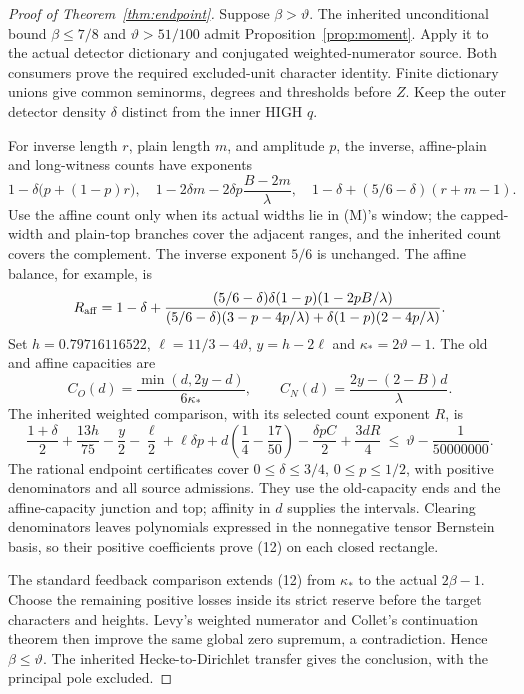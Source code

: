 \documentclass[10pt,a4paper]{article}
\newcommand{\tht}{\vartheta}\newcommand{\kap}{\kappa}
\begin{document}
\begin{proof}[Proof of Theorem~\ref{thm:endpoint}]
Suppose $\beta>\tht$. The inherited unconditional bound $\beta\le7/8$
and $\tht>51/100$ admit Proposition~\ref{prop:moment}. Apply it to the
actual detector dictionary and conjugated weighted-numerator source. Both
consumers prove the required excluded-unit character identity. Finite
dictionary unions give common seminorms, degrees and thresholds before $Z$.
Keep the outer detector density $\delta$ distinct from the inner HIGH $q$.

For inverse length $r$, plain length $m$, and amplitude $p$, the inverse,
affine-plain and long-witness counts have exponents
\[
 1-\delta\bigl(p+(1-p)r\bigr),\quad
 1-2\delta m-2\delta p\frac{B-2m}{\lambda},\quad
 1-\delta+(5/6-\delta)(r+m-1).                          \tag{11}
\]
Use the affine count only when its actual widths lie in (M)'s window; the
capped-width and plain-top branches cover the adjacent ranges, and the
inherited count covers the complement. The inverse exponent $5/6$ is
unchanged. The affine balance, for example, is
\[
 R_{\rm aff}=1-\delta+
 \frac{(5/6-\delta)\delta(1-p)(1-2pB/\lambda)}
 {(5/6-\delta)(3-p-4p/\lambda)+\delta(1-p)(2-4p/\lambda)}.
\]
Set $h=0.79716116522$, $\ell=11/3-4\tht$, $y=h-2\ell$ and
$\kap_*=2\tht-1$. The old and affine capacities are
\[
 C_O(d)=\frac{\min(d,2y-d)}{6\kap_*},\qquad
 C_N(d)=\frac{2y-(2-B)d}{\lambda}.
\]
The inherited weighted comparison, with its selected count exponent $R$, is
\[
 \frac{1+\delta}{2}+\frac{13h}{75}-\frac y2-\frac\ell2+\ell\delta p
 +d\left(\frac14-\frac{17}{50}\right)-\frac{\delta pC}{2}
 +\frac{3dR}{4}\ \le\ \tht-\frac1{50000000}.           \tag{12}
\]
The rational endpoint certificates cover $0\le\delta\le3/4$,
$0\le p\le1/2$, with positive denominators and all source admissions.
They use the old-capacity ends and the affine-capacity junction and top;
affinity in $d$ supplies the intervals. Clearing denominators leaves
polynomials expressed in the nonnegative tensor Bernstein basis, so their
positive coefficients prove (12) on each closed rectangle.

The standard feedback comparison extends (12) from
$\kap_*$ to the actual $2\beta-1$. Choose the remaining positive losses
inside its strict reserve before the target characters and heights.
Levy's weighted numerator and Collet's continuation theorem
\cite{levy,collet} then improve the same global zero supremum, a contradiction.
Hence $\beta\le\tht$. The inherited Hecke-to-Dirichlet transfer gives
the conclusion, with the principal pole excluded.
\end{proof}
\end{document}
